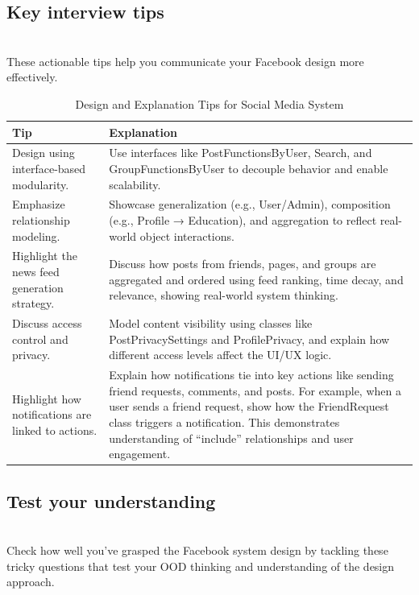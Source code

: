 \subsection{Key interview tips}\label{mkfuMpCrxoDuJ9bDv4r-u}
\\
These actionable tips help you communicate your Facebook design more effectively.

\begin{table}[h!]
\centering
\begin{tabularx}{\textwidth}{|X|X|}
\hline
\textbf{Tip} & \textbf{Explanation} \\
\hline
Design using interface-based modularity. & Use interfaces like PostFunctionsByUser, Search, and GroupFunctionsByUser to decouple behavior and enable scalability. \\
\hline
Emphasize relationship modeling. & Showcase generalization (e.g., User/Admin), composition (e.g., Profile → Education), and aggregation to reflect real-world object interactions. \\
\hline
Highlight the news feed generation strategy. & Discuss how posts from friends, pages, and groups are aggregated and ordered using feed ranking, time decay, and relevance, showing real-world system thinking. \\
\hline
Discuss access control and privacy. & Model content visibility using classes like PostPrivacySettings and ProfilePrivacy, and explain how different access levels affect the UI/UX logic. \\
\hline
Highlight how notifications are linked to actions. & Explain how notifications tie into key actions like sending friend requests, comments, and posts. For example, when a user sends a friend request, show how the FriendRequest class triggers a notification. This demonstrates understanding of “include” relationships and user engagement. \\
\hline
\end{tabularx}
\caption{Design and Explanation Tips for Social Media System}
\label{tab:social_media_tips}
\end{table}

\subsection{Test your understanding}\label{K3brrBHtXmdHXejbUywHv}
\\
Check how well you've grasped the Facebook system design by tackling these tricky questions that test your OOD thinking and understanding of the design approach.

